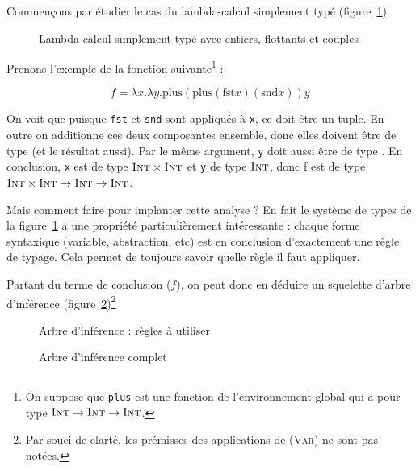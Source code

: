 Commençons par étudier le cas du lambda-calcul simplement typé
(figure~\ref{fig:stlc}).

\begin{figure}



\caption{Lambda calcul simplement typé avec entiers, flottants et couples}
\label{fig:stlc}

\end{figure}

Prenons l'exemple de la fonction suivante\footnote{ On suppose que \texttt{plus}
est une fonction de l'environnement global qui a pour type $\textsc{Int} \rightarrow
\textsc{Int} \rightarrow \textsc{Int}$.} :

\[
f = λx.λy. \textrm{plus} (\textrm{plus} (\textrm{fst} x) (\textrm{snd} x)) y
\]

On voit que puisque \texttt{fst} et \texttt{snd} sont appliqués à \texttt{x}, ce
doit être un tuple. En outre on additionne ces deux composantes ensemble, donc
elles doivent être de type \tInt (et le résultat aussi). Par le même argument,
\texttt{y} doit aussi être de type \tInt. En conclusion, \texttt{x} est de type
$\textsc{Int} \times \textsc{Int}$ et \texttt{y} de type $\textsc{Int}$, donc f est de type $\textsc{Int}
\times \textsc{Int} \rightarrow \textsc{Int} \rightarrow \textsc{Int}$.

Mais comment faire pour implanter cette analyse ? En fait le système de types de
la figure~\ref{fig:stlc} a une propriété particulièrement intéressante : chaque
forme syntaxique (variable, abstraction, etc) est en conclusion d'exactement une
règle de typage. Cela permet de toujours savoir quelle règle il faut appliquer.

Partant du terme de conclusion ($f$), on peut donc en déduire un squelette
d'arbre d'inférence (figure~\ref{fig:inftree-rules})\footnote{Par souci de
clarté, les prémisses des applications de \textsc{(Var)} ne sont pas notées.}

\begin{figure} %
\def\disptypeL#1{}
\def\disptypeR#1{}



\caption{Arbre d'inférence : règles à utiliser}
\label{fig:inftree-rules}
\end{figure} %

\begin{figure} %
\def\disptypeL#1{:#1}
\def\disptypeR#1{:#1}



\caption{Arbre d'inférence complet}
\label{fig:inftree-full}
\end{figure} %

